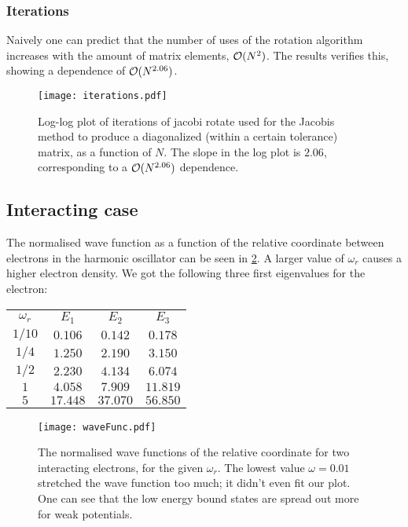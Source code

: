 \subsubsection{Iterations}
Naively one can predict that the number of uses of the rotation algorithm
increases with the amount of matrix elements, $\mathcal{O}(N^2)$.
The results  verifies this, showing a dependence of
$\mathcal{O}(N^{2.06})$.



\begin{figure}[H]
    \centering
    \texttt{[image: iterations.pdf]}
    \caption{Log-log plot of iterations of jacobi rotate used for the
        Jacobis method to produce a diagonalized (within a certain
        tolerance) matrix, as a function of $N$. The slope in the log plot
        is $2.06$, corresponding to a $\mathcal{O}(N^{2.06})$ dependence.}
    \label{fig:iterations}
\end{figure}


\subsection{Interacting case}
The normalised wave function as a function of the relative coordinate between
electrons in the harmonic oscillator can be seen in \cref{fig:waveFunc}.
A larger value of $\omega_r$ causes a higher electron density. We got the
following three first eigenvalues for the electron:


\begin{center}
\begin{tabular}{ | c | c | c | c | }
    \hline
    $\omega_r$&$E_1$&$E_2$&$E_3$     \\
    $1/10$ & $0.106$ & $0.142$ & $0.178$ \\
    $1/4$ & $1.250$ & $2.190$ & $3.150$ \\
    $1/2$ & $2.230$ & $4.134$ & $6.074$ \\
    $1$ & $4.058$ & $7.909$ & $11.819$\\
    $5$ & $17.448$ & $37.070$ & $56.850$ \\
    \hline
 \end{tabular}
\end{center}




\begin{figure}[H]
    \centering
    \texttt{[image: waveFunc.pdf]}
    \caption{The normalised wave functions of the relative coordinate for two
    interacting electrons, for the given $\omega_r$. The lowest value 
$\omega = 0.01$ stretched the wave function too much; it didn't even fit our
plot. One can see that the low energy bound states are spread out more for weak
potentials. }
    \label{fig:waveFunc}
\end{figure}



